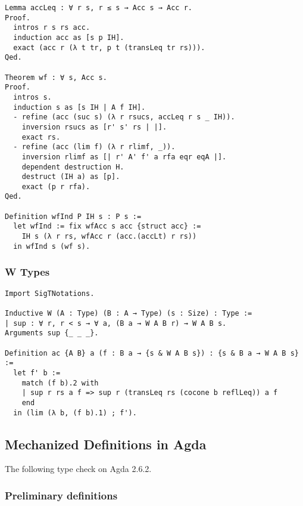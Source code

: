 \documentclass[acmsmall,review,anonymous]{acmart}\settopmatter{printfolios=true,printccs=false,printacmref=false}
\begin{document}
\begin{verbatim}
Lemma accLeq : ∀ r s, r ≤ s → Acc s → Acc r.
Proof.
  intros r s rs acc.
  induction acc as [s p IH].
  exact (acc r (λ t tr, p t (transLeq tr rs))).
Qed.

Theorem wf : ∀ s, Acc s.
Proof.
  intros s.
  induction s as [s IH | A f IH].
  - refine (acc (suc s) (λ r rsucs, accLeq r s _ IH)).
    inversion rsucs as [r' s' rs | |].
    exact rs.
  - refine (acc (lim f) (λ r rlimf, _)).
    inversion rlimf as [| r' A' f' a rfa eqr eqA |].
    dependent destruction H.
    destruct (IH a) as [p].
    exact (p r rfa).
Qed.

Definition wfInd P IH s : P s :=
  let wfInd := fix wfAcc s acc {struct acc} :=
    IH s (λ r rs, wfAcc r (acc.(accLt) r rs))
  in wfInd s (wf s).
\end{verbatim}

\subsubsection{W Types} \label{app:mechanization:coq:W}

\begin{verbatim}
Import SigTNotations.

Inductive W (A : Type) (B : A → Type) (s : Size) : Type :=
| sup : ∀ r, r < s → ∀ a, (B a → W A B r) → W A B s.
Arguments sup {_ _ _}.

Definition ac {A B} a (f : B a → {s & W A B s}) : {s & B a → W A B s} :=
  let f' b :=
    match (f b).2 with
    | sup r rs a f => sup r (transLeq rs (cocone b reflLeq)) a f
    end
  in (lim (λ b, (f b).1) ; f').
\end{verbatim}

\subsection{Mechanized \CICE Definitions in Agda}

The following type check on Agda 2.6.2.

\subsubsection{Preliminary definitions} \label{app:mechanization:agda:prelim}
\end{document}
